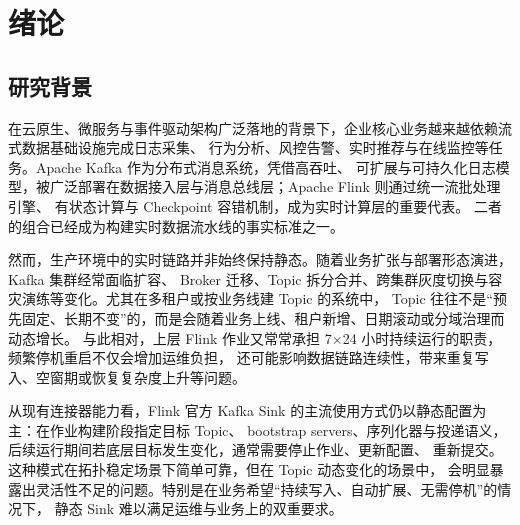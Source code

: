 
\chapter{绪论}

\section{研究背景}

在云原生、微服务与事件驱动架构广泛落地的背景下，企业核心业务越来越依赖流式数据基础设施完成日志采集、
行为分析、风控告警、实时推荐与在线监控等任务。Apache Kafka 作为分布式消息系统，凭借高吞吐、
可扩展与可持久化日志模型，被广泛部署在数据接入层与消息总线层；Apache Flink 则通过统一流批处理引擎、
有状态计算与 Checkpoint 容错机制，成为实时计算层的重要代表\cite{kreps2011kafka,carbone2015flink}。
二者的组合已经成为构建实时数据流水线的事实标准之一。

然而，生产环境中的实时链路并非始终保持静态。随着业务扩张与部署形态演进，Kafka 集群经常面临扩容、
Broker 迁移、Topic 拆分合并、跨集群灰度切换与容灾演练等变化。尤其在多租户或按业务线建 Topic 的系统中，
Topic 往往不是“预先固定、长期不变”的，而是会随着业务上线、租户新增、日期滚动或分域治理而动态增长。
与此相对，上层 Flink 作业又常常承担 7×24 小时持续运行的职责，频繁停机重启不仅会增加运维负担，
还可能影响数据链路连续性，带来重复写入、空窗期或恢复复杂度上升等问题。

从现有连接器能力看，Flink 官方 Kafka Sink 的主流使用方式仍以静态配置为主：在作业构建阶段指定目标 Topic、
bootstrap servers、序列化器与投递语义，后续运行期间若底层目标发生变化，通常需要停止作业、更新配置、
重新提交\cite{flinkKafkaDocs,flinkUnifiedSink}。这种模式在拓扑稳定场景下简单可靠，但在 Topic 动态变化的场景中，
会明显暴露出灵活性不足的问题。特别是在业务希望“持续写入、自动扩展、无需停机”的情况下，
静态 Sink 难以满足运维与业务上的双重要求。

